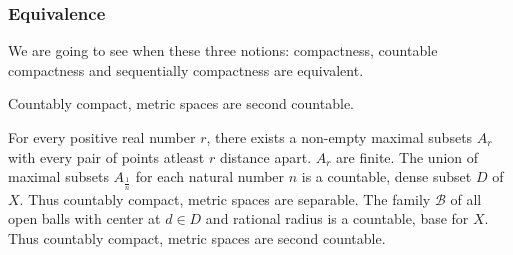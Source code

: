 \subsubsection{Equivalence}
	We are going to see when these three notions: compactness, countable compactness and sequentially compactness are equivalent.

\begin{theorem}
	Countably compact, metric spaces are second countable.
\end{theorem}
\begin{synopsis}
	For every positive real number $r$,   there exists a non-empty maximal subsets $A_r$ with every pair of points atleast $r$ distance apart.
	$A_r$ are finite.
	The union of maximal subsets $A_\frac{1}{n}$ for each natural number $n$ is a countable, dense subset $D$ of $X$.
	Thus countably compact, metric spaces are separable.
	The family $\mathcal{B}$ of all open balls with center at $d \in D$ and rational radius is a countable, base for $X$.
	Thus countably compact, metric spaces are second countable.
\end{synopsis}
